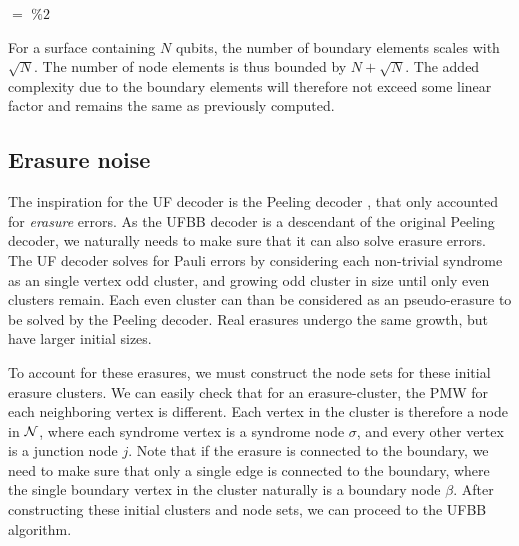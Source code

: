 \begin{algo}[algotitle=CalcParity for surfaces with boundaries, label=al:calcparity2]
\begin{algorithm}[H]

\KwData{\node}

\BlankLine

\parity $=$  $\%2$\;
\end{algorithm}
\end{algo}

For a surface containing $N$ qubits, the number of boundary elements scales with $\sqrt{N}$. The number of node elements is thus bounded by $N + \sqrt{N}$. The added complexity due to the boundary elements will therefore not exceed some linear factor and remains the same as previously computed.


\subsection{Erasure noise}

The inspiration for the UF decoder is the Peeling decoder \cite{delfosse2017linear}, that only accounted for \emph{erasure} errors. As the UFBB decoder is a descendant of the original Peeling decoder, we naturally needs to make sure that it can also solve erasure errors. The UF decoder solves for Pauli errors by considering each non-trivial syndrome as an single vertex odd cluster, and growing odd cluster in size until only even clusters remain. Each even cluster can than be considered as an pseudo-erasure to be solved by the Peeling decoder. Real erasures undergo the same growth, but have larger initial sizes.

To account for these erasures, we must construct the node sets for these initial erasure clusters. We can easily check that for an erasure-cluster, the PMW for each neighboring vertex is different. Each vertex in the cluster is therefore a node in $\mathcal{N}$, where each syndrome vertex is a syndrome node $\sigma$, and every other vertex is a junction node $j$. Note that if the erasure is connected to the boundary, we need to make sure that only a single edge is connected to the boundary, where the single boundary vertex in the cluster naturally is a boundary node $\beta$. After constructing these initial clusters and node sets, we can proceed to the UFBB algorithm.  
